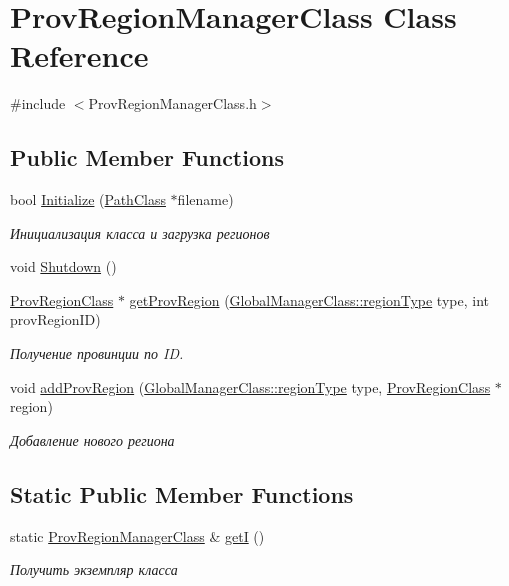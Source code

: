 \hypertarget{class_prov_region_manager_class}{}\section{Prov\+Region\+Manager\+Class Class Reference}
\label{class_prov_region_manager_class}


{\ttfamily \#include $<$Prov\+Region\+Manager\+Class.\+h$>$}

\subsection*{Public Member Functions}
\begin{DoxyCompactItemize}
\item 
bool \hyperlink{class_prov_region_manager_class_ab19852a66d53076486ff94ff4afd1d2b}{Initialize} (\hyperlink{class_path_class}{Path\+Class} $\ast$filename)
\begin{DoxyCompactList}\small\item\em Инициализация класса и загрузка регионов \end{DoxyCompactList}\item 
void \hyperlink{class_prov_region_manager_class_a524eb11df226ed26ff043fb241707892}{Shutdown} ()
\item 
\hyperlink{class_prov_region_class}{Prov\+Region\+Class} $\ast$ \hyperlink{class_prov_region_manager_class_acb065f994fb4de59e44b3dde97c6dcff}{get\+Prov\+Region} (\hyperlink{class_global_manager_class_a794b4a5298c61f8d25d9da44b7826857}{Global\+Manager\+Class\+::region\+Type} type, int prov\+Region\+ID)
\begin{DoxyCompactList}\small\item\em Получение провинции по ID. \end{DoxyCompactList}\item 
void \hyperlink{class_prov_region_manager_class_ae711031e9a2573adff5211aa1f0c4373}{add\+Prov\+Region} (\hyperlink{class_global_manager_class_a794b4a5298c61f8d25d9da44b7826857}{Global\+Manager\+Class\+::region\+Type} type, \hyperlink{class_prov_region_class}{Prov\+Region\+Class} $\ast$region)
\begin{DoxyCompactList}\small\item\em Добавление нового региона \end{DoxyCompactList}\end{DoxyCompactItemize}
\subsection*{Static Public Member Functions}
\begin{DoxyCompactItemize}
\item 
static \hyperlink{class_prov_region_manager_class}{Prov\+Region\+Manager\+Class} \& \hyperlink{class_prov_region_manager_class_ac9254dfc6ffc772b7cb723d31915fb73}{getI} ()
\begin{DoxyCompactList}\small\item\em Получить экземпляр класса \end{DoxyCompactList}\end{DoxyCompactItemize}
